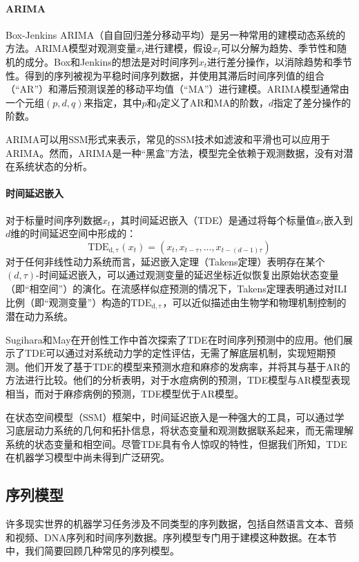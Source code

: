     \paragraph*{ARIMA}
Box-Jenkins ARIMA（自自回归差分移动平均）是另一种常用的建模动态系统的方法。ARIMA模型对观测变量$x_t$进行建模，假设$x_t$可以分解为趋势、季节性和随机的成分。Box和Jenkins的想法是对时间序列$x_t$进行差分操作，以消除趋势和季节性。得到的序列被视为平稳时间序列数据，并使用其滞后时间序列值的组合（“AR”）和滞后预测误差的移动平均值（“MA”）进行建模。ARIMA模型通常由一个元组$(p, d, q)$来指定，其中$p$和$q$定义了AR和MA的阶数，$d$指定了差分操作的阶数。

ARIMA可以用SSM形式来表示，常见的SSM技术如滤波和平滑也可以应用于ARIMA。然而，ARIMA是一种“黑盒”方法，模型完全依赖于观测数据，没有对潜在系统状态的分析。

\paragraph*{时间延迟嵌入}
对于标量时间序列数据$x_t$，其时间延迟嵌入（TDE）是通过将每个标量值$x_t$嵌入到$d$维的时间延迟空间中形成的：
\begin{equation*}
\mathrm{TDE_{d, \tau}}(x_t) = (x_t, x_{t-\tau}, ..., x_{t-(d-1)\tau}) %
\end{equation*}
对于任何非线性动力系统而言，延迟嵌入定理（Takens定理）表明存在某个$(d, \tau)$-时间延迟嵌入，可以通过观测变量的延迟坐标近似恢复出原始状态变量（即“相空间”）的演化。在流感样似症预测的情况下，Takens定理表明通过对ILI比例（即“观测变量”）构造的$\mathrm{TDE_{d, \tau}}$，可以近似描述由生物学和物理机制控制的潜在动力系统。

Sugihara和May在开创性工作中首次探索了TDE在时间序列预测中的应用。他们展示了TDE可以通过对系统动力学的定性评估，无需了解底层机制，实现短期预测。他们开发了基于TDE的模型来预测水痘和麻疹的发病率，并将其与基于AR的方法进行比较。他们的分析表明，对于水痘病例的预测，TDE模型与AR模型表现相当，而对于麻疹病例的预测，TDE模型优于AR模型。

在状态空间模型（SSM）框架中，时间延迟嵌入是一种强大的工具，可以通过学习底层动力系统的几何和拓扑信息，将状态变量和观测数据联系起来，而无需理解系统的状态变量和相空间。尽管TDE具有令人惊叹的特性，但据我们所知，TDE在机器学习模型中尚未得到广泛研究。

\subsection{序列模型}
许多现实世界的机器学习任务涉及不同类型的序列数据，包括自然语言文本、音频和视频、DNA序列和时间序列数据。序列模型专门用于建模这种数据。在本节中，我们简要回顾几种常见的序列模型。

